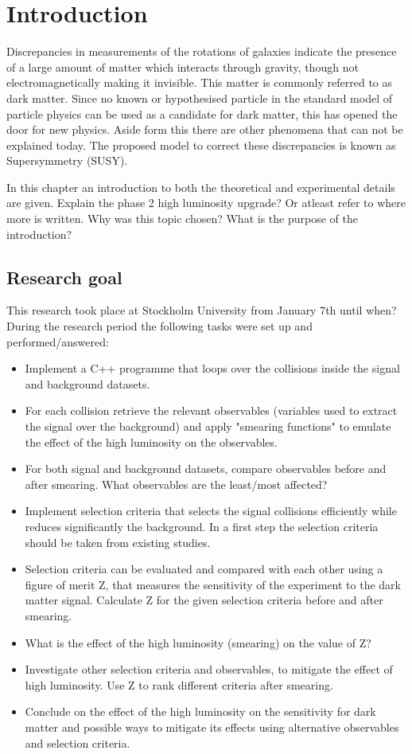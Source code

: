 \chapter{Introduction}\label{cha:intro}
Discrepancies in measurements of the rotations of galaxies indicate the presence of a large amount of matter which interacts through gravity, though not electromagnetically making it invisible. This matter is commonly referred to as dark matter. Since no known or hypothesised particle in the standard model of particle physics can be used as a candidate for dark matter, this has opened the door for new physics. Aside form this there are other phenomena that can not be explained today. The proposed model to correct these discrepancies is known as Supersymmetry (SUSY).  


In this chapter an introduction to both the theoretical and experimental details are given. 
Explain the phase 2 high luminosity upgrade? Or atleast refer to where more is written.
Why was this topic chosen? What is the purpose of the introduction?

\newpage
\section{Research goal}\label{sec:goal}
This research took place at Stockholm University from January 7th until when?
During the research period the following tasks were set up and performed/answered:
\begin{itemize}
\item Implement a C++ programme that loops over the collisions inside the signal and background datasets.	
\item For each collision retrieve the relevant observables (variables used to	 extract the signal over the background) and apply "smearing functions" to emulate the effect of the high luminosity on the observables. 	
\item For both signal and background datasets, compare observables before and after smearing. What observables are the least/most affected?	
\item Implement selection criteria that selects the signal collisions efficiently while reduces significantly the background. In a first step the selection criteria should be taken from existing studies.
\item Selection criteria can be evaluated and compared with each other using a figure of merit Z, that measures the sensitivity of the experiment to the	 dark matter signal. Calculate Z for the given selection criteria before and after smearing.
\item What is the effect of the high luminosity (smearing) on the value of Z?
\item Investigate other selection criteria and observables, to mitigate the effect of high luminosity. Use Z to rank different criteria after smearing.
\item Conclude on the effect of the high luminosity on the sensitivity for dark matter and possible ways to mitigate its effects using alternative observables and selection criteria. 
\end{itemize}
\newpage
